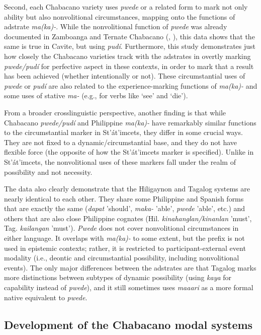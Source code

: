 Second, each Chabacano variety uses \textit{pwede} or a related form to mark not only ability but also nonvolitional circumstances, mapping onto the functions of adstrate \textit{ma(ka)-}. While the nonvolitional function of \textit{pwede} was already documented in Zamboanga and Ternate Chabacano (\citealt{Rubino2008}, \citealt{Sippola2011}), this data shows that the same is true in Cavite, but using \textit{pudí}. Furthermore, this study demonstrates just how closely the Chabacano varieties track with the adstrates in overtly marking \textit{pwede/pudí} for perfective aspect in these contexts, in order to mark that a result has been achieved (whether intentionally or not). These circumstantial uses of \textit{pwede} or \textit{pudí} are also related to the experience-marking functions of \textit{ma(ka)-} and some uses of stative \textit{ma-} (e.g., for verbs like ‘see’ and ‘die’). 

From a broader crosslinguistic perspective, another finding is that while Chabacano \textit{pwede/pudí} and Philippine \textit{ma(ka)-} have remarkably similar functions to the circumstantial marker in St’át’imcets, they differ in some crucial ways. They are not fixed to a dynamic/circumstantial base, and they do not have flexible force (the opposite of how the St’át’imcets marker is specified). Unlike in St’át’imcets, the nonvolitional uses of these markers fall under the realm of possibility and not necessity.

The data also clearly demonstrate that the Hiligaynon and Tagalog systems are nearly identical to each other. They share some Philippine and Spanish forms that are exactly the same (\textit{dapat} {}'should', \textit{maka-} 'able', \textit{pwede} 'able', etc.) and others that are also close Philippine cognates (Hil. \textit{kinahanglan/kinanlan} 'must', Tag. \textit{kailangan} 'must'). \textit{Pwede} does not cover nonvolitional circumstances in either language. It overlaps with \textit{ma(ka)-} to some extent, but the prefix is not used in epistemic contexts; rather, it is restricted to participant-external event modality (i.e., deontic and circumstantial possibility, including nonvolitional events). The only major differences between the adstrates are that Tagalog marks more distinctions between subtypes of dynamic possibility (using \textit{kaya} for capability instead of \textit{pwede}), and it still sometimes uses \textit{maaari} as a more formal native equivalent to \textit{pwede}.

\subsection{Development of the Chabacano modal systems}


